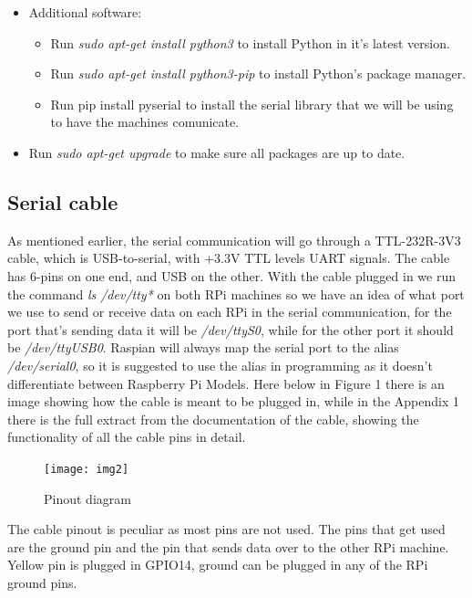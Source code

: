 \documentclass[a4paper, 12pt]{book}
\begin{document}
\begin{itemize}
\begin{itemize}
    \end{itemize}
    \item Additional software:
    \begin{itemize}
        \item Run \textit{sudo apt-get install python3} to install Python in it's latest version.
        \item Run \textit{sudo apt-get install python3-pip} to install Python's package manager.
        \item Run {pip install pyserial} to install the serial library that we will be using to have the machines comunicate.
    \end{itemize}
    \item Run \textit{sudo apt-get upgrade} to make sure all packages are up to date.
\end{itemize}

\subsection{Serial cable}
As mentioned earlier, the serial communication will go through a TTL-232R-3V3 cable, which is USB-to-serial, with +3.3V TTL levels UART signals. The cable has 6-pins on one end, and USB on the other.
With the cable plugged in we run the command \textit{ls /dev/tty*} on both RPi machines so we have an idea of what port we use to send or receive data on each RPi in the serial communication, for the port that's sending data it will be \textit{/dev/ttyS0}, while for the other port it should be \textit{/dev/ttyUSB0}. Raspian will always map the serial port to the alias \textit{/dev/serial0}, so it is suggested to use the alias in programming as it doesn't differentiate between Raspberry Pi Models. Here below in Figure 1 there is an image showing how the cable is meant to be plugged in, while in the Appendix 1 there is the full extract from the documentation of the cable, showing the functionality of all the cable pins in detail.

\begin{figure}[h!]
    \centering
    \texttt{[image: img2]}
    \caption{Pinout diagram}
    \label{fig:figure1}
\end{figure}

The cable pinout is peculiar as most pins are not used. The pins that get used are the ground pin and the pin that sends data over to the other RPi machine. Yellow pin is plugged in GPIO14, ground can be plugged in any of the RPi ground pins.
\end{document}

